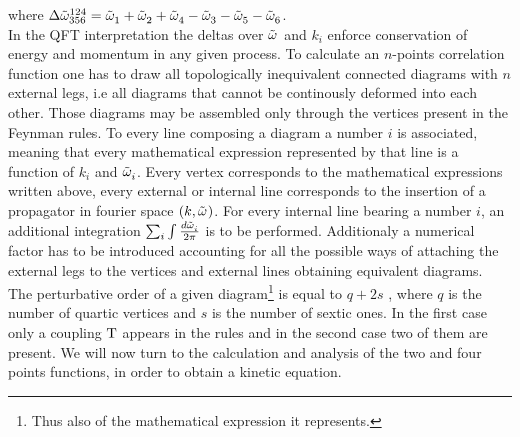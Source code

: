 \begin{center}
\end{center}
where $ \Delta{\tilde{\omega}}^{124}_{356} = \tilde{\omega}^{}_1 + \tilde{\omega}^{}_2 + \tilde{\omega}^{}_4 - \tilde{\omega}^{}_3 - \tilde{\omega}^{}_5 - \tilde{\omega}^{}_6$. \\

In the QFT interpretation the deltas over $\tilde{\omega}^{}$ and $k_i$ enforce conservation of energy and momentum in any given process. To calculate an $n$-points 
correlation function one has to draw all topologically inequivalent connected diagrams with $n$ external legs, i.e all diagrams that cannot be continously deformed into each other.
Those diagrams may be assembled only through the vertices present in the Feynman rules. To every line composing a diagram a number $i$ is associated,
meaning that every mathematical expression represented by that line is a function of $k_i$ and $\tilde{\omega}^{}_i$. Every vertex corresponds to the mathematical expressions 
written above, every external or internal line corresponds to the insertion of a propagator in fourier space $(k, \tilde{\omega}^{})$. For every internal line bearing a number 
$i$, an additional integration $\sum_i \int \frac{d\tilde{\omega}^{}_i}{2\pi}$ is to be performed. Additionaly a numerical factor has to be introduced accounting for all the possible 
ways of attaching the external legs to the vertices and external lines obtaining equivalent diagrams. \\
The perturbative order of a given diagram\footnote{Thus also of the mathematical expression it represents.} is equal to $q + 2s$ , where $q$ is the number of quartic vertices 
and $s$ is the number of sextic ones. In the first case only a coupling $\mathrm{T}$ appears in the rules and in the second case two of them are present. 
We will now turn to the calculation and analysis of the two and four points functions, in order to obtain a kinetic equation. \\

